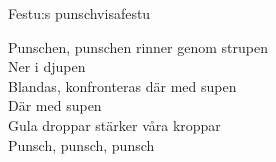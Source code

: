 \begin{song}{Festu:s punschvisa}{festu}
\begin{vers}
Punschen, punschen rinner genom strupen\\
Ner i djupen\\
Blandas, konfronteras där med supen\\
Där med supen\\
Gula droppar stärker våra kroppar\\
Punsch, punsch, punsch\\
\end{vers}
\end{song}
